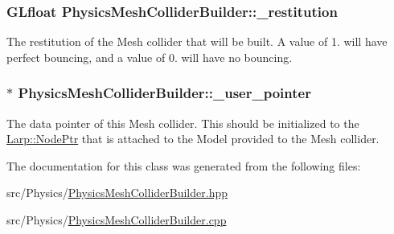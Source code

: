 \subsubsection[{\texorpdfstring{\+\_\+restitution}{_restitution}}]{\setlength{\rightskip}{0pt plus 5cm}G\+Lfloat Physics\+Mesh\+Collider\+Builder\+::\+\_\+restitution\hspace{0.3cm}{\ttfamily [private]}}\hypertarget{classPhysicsMeshColliderBuilder_afd9be67d71afcfedbb4a245e38db0947}{}\label{classPhysicsMeshColliderBuilder_afd9be67d71afcfedbb4a245e38db0947}
The restitution of the Mesh collider that will be built. A value of 1. will have perfect bouncing, and a value of 0. will have no bouncing. 
\subsubsection[{\texorpdfstring{\+\_\+user\+\_\+pointer}{_user_pointer}}]{$\ast$ Physics\+Mesh\+Collider\+Builder\+::\+\_\+user\+\_\+pointer\hspace{0.3cm}{\ttfamily [private]}}\hypertarget{classPhysicsMeshColliderBuilder_adef014a03eaa91a9006d50267d1068b3}{}\label{classPhysicsMeshColliderBuilder_adef014a03eaa91a9006d50267d1068b3}
The data pointer of this Mesh collider. This should be initialized to the \hyperlink{namespaceLarp_a171c1dc8b70cfb441b15d7386780db23}{Larp\+::\+Node\+Ptr} that is attached to the Model provided to the Mesh collider. 

The documentation for this class was generated from the following files\+:\begin{DoxyCompactItemize}
\item 
src/\+Physics/\hyperlink{PhysicsMeshColliderBuilder_8hpp}{Physics\+Mesh\+Collider\+Builder.\+hpp}\item 
src/\+Physics/\hyperlink{PhysicsMeshColliderBuilder_8cpp}{Physics\+Mesh\+Collider\+Builder.\+cpp}\end{DoxyCompactItemize}
